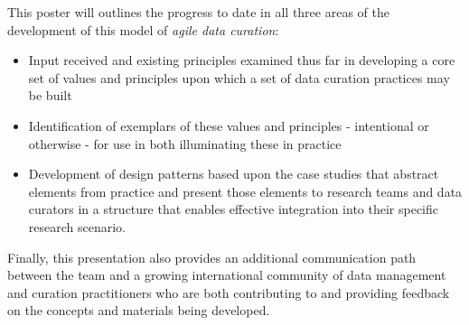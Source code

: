 \documentclass[poster,17]{idcc}
\begin{document}
This poster will outlines the progress to date in all three areas of the
development of this model of \emph{agile data curation}:

\begin{itemize}
\itemsep1pt\parskip0pt
\item
  Input received and existing principles examined thus far in developing
  a core set of values and principles upon which a set of data curation
  practices may be built
\item
  Identification of exemplars of these values and principles -
  intentional or otherwise - for use in both illuminating these in
  practice
\item
  Development of design patterns based upon the case studies that
  abstract elements from practice and present those elements to research
  teams and data curators in a structure that enables effective
  integration into their specific research scenario.
\end{itemize}

Finally, this presentation also provides an additional communication
path between the team and a growing international community of data
management and curation practitioners who are both contributing to and
providing feedback on the concepts and materials being developed.
\end{document}
